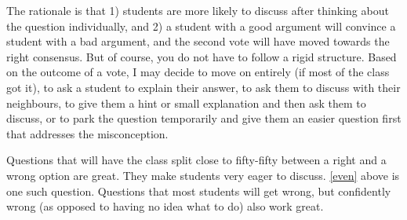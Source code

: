 \documentclass[11pt]{article}
\newcommand{\vv}{\vspace{.5cm}}
\begin{document}
{\baselineskip
The rationale is that 1) students are more likely to discuss after thinking about the question individually, and 2) a student with a good argument will convince a student with a bad argument, and the second vote will have moved towards the right consensus.  But of course, you do not have to follow a rigid structure.  Based on the outcome of a vote, I may decide to move on entirely (if most of the class got it), to ask a student to explain their answer,  to ask them to discuss with their neighbours, to give them a hint or small explanation and then ask them to discuss, or to park the question temporarily and give them an easier question first that addresses the misconception.

Questions that will have the class split close to fifty-fifty between a right and a wrong option are great.  They make students very eager to discuss.  \autoref{even} above is one such question.  Questions that most students will get wrong, but confidently wrong (as opposed to having no idea what to do) also work great.
}

\vv
\end{document}

